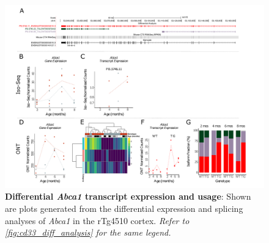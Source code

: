 \begin{landscape}
	\begin{figure}[htp]
		\begin{center}
			\includegraphics[page=1,trim={0 0.5cm 0 1.5cm},scale =0.85]{Figures/TargetGene_DifferentialAnalysis.pdf}
		\end{center}
		\captionsetup{width=1.5\textwidth}
		\caption[Differential \textit{Abca1} transcript expression and usage]%
		{\textbf{Differential \textit{Abca1} transcript expression and usage}: Shown are plots generated from the differential expression and splicing analyses of \textit{Abca1} in the rTg4510 cortex. \textit{Refer to \cref{fig:cd33_diff_analysis} for the same legend.}}   
		\label{fig:abca1_diff_analysis}
	\end{figure}
\end{landscape}

